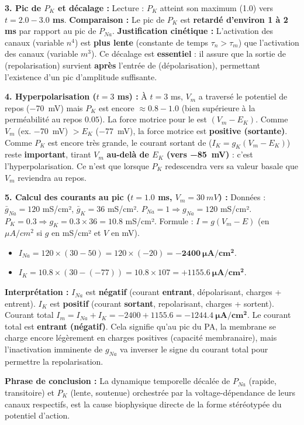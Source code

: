 \documentclass[11pt]{article}
\begin{document}
\begin{exoresolu}
\textbf{3. Pic de $P_K$ et décalage :}
Lecture : $P_K$ atteint son maximum (1.0) vers \textbf{$t = 2.0 - 3.0$ ms}.
\textbf{Comparaison :} Le pic de $P_K$ est \textbf{retardé d'environ 1 à 2 ms} par rapport au pic de $P_{Na}$.
\textbf{Justification cinétique :} L'activation des canaux  (variable $n^4$) est \textbf{plus lente} (constante de temps $\tau_n > \tau_m$) que l'activation des canaux  (variable $m^3$). Ce décalage est \textbf{essentiel} : il assure que la sortie de  (repolarisation) survient \textbf{après} l'entrée de  (dépolarisation), permettant l'existence d'un pic d'amplitude suffisante.

\textbf{4. Hyperpolarisation ($t=3$ ms) :}
À $t=3$ ms, $V_m$ a traversé le potentiel de repos (\SI{-70}{mV}) mais $P_K$ est encore $\approx 0.8-1.0$ (bien supérieure à la perméabilité au repos $0.05$).
La force motrice pour le  est $(V_m - E_K)$. Comme $V_m$ (ex. \SI{-70}{mV}) $> E_K$ (\SI{-77}{mV}), la force motrice est \textbf{positive (sortante)}.
Comme $P_K$ est encore très grande, le courant sortant de  ($I_K = g_K(V_m-E_K)$) reste \textbf{important}, tirant $V_m$ \textbf{au-delà de $E_K$ (vers \SI{-85}{mV})} : c'est l'hyperpolarisation. Ce n'est que lorsque $P_K$ redescendra vers sa valeur basale que $V_m$ reviendra au repos.

\textbf{5. Calcul des courants au pic ($t=1.0$ ms, $V_m = \SI{+30}{mV}$) :}
Données : $\bar{g}_{Na} = 120$ mS/cm², $\bar{g}_K = 36$ mS/cm². $P_{Na}=1 \Rightarrow g_{Na} = 120$ mS/cm². $P_K=0.3 \Rightarrow g_K = 0.3 \times 36 = 10.8$ mS/cm².
Formule : $I = g (V_m - E)$ (en $\mu A/cm^2$ si $g$ en mS/cm² et $V$ en mV).
\begin{itemize}
    \item $I_{Na} = 120 \times (30 - 50) = 120 \times (-20) = \mathbf{-2400\ \mu A/cm^2}$.
    \item $I_K = 10.8 \times (30 - (-77)) = 10.8 \times 107 = \mathbf{+1155.6\ \mu A/cm^2}$.
\end{itemize}
\textbf{Interprétation :} $I_{Na}$ est \textbf{négatif} (courant \textbf{entrant}, dépolarisant, charges + entrent). $I_K$ est \textbf{positif} (courant \textbf{sortant}, repolarisant, charges + sortent).
Courant total $I_m = I_{Na} + I_K = -2400 + 1155.6 = \mathbf{-1244.4\ \mu A/cm^2}$.
Le courant total est \textbf{entrant (négatif)}. Cela signifie qu'au pic du PA, la membrane se charge encore légèrement en charges positives (capacité membranaire), mais l'inactivation imminente de $g_{Na}$ va inverser le signe du courant total pour permettre la repolarisation.

\textbf{Phrase de conclusion :} La dynamique temporelle décalée de $P_{Na}$ (rapide, transitoire) et $P_K$ (lente, soutenue) orchestrée par la voltage-dépendance de leurs canaux respectifs, est la cause biophysique directe de la forme stéréotypée du potentiel d'action.
\end{exoresolu}
\end{document}
